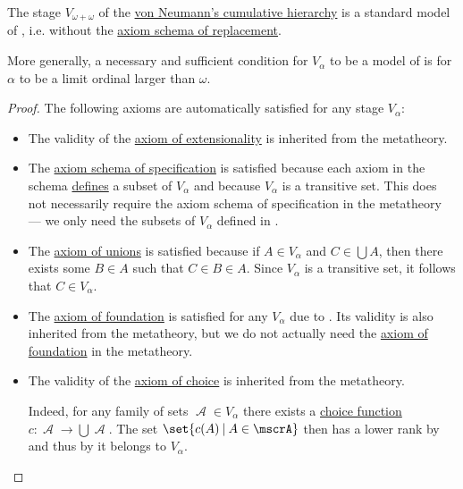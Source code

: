 \begin{theorem}\label{thm:cumulative_hierarchy_model_of_z}
  The stage \( V_{\omega + \omega} \) of the \hyperref[def:cumulative_hierarchy]{von Neumann's cumulative hierarchy} is a standard model of , i.e.  without the \hyperref[def:zfc/replacement]{axiom schema of replacement}.

  More generally, a necessary and sufficient condition for \( V_\alpha \) to be a model of  is for \( \alpha \) to be a limit ordinal larger than \( \omega \).
\end{theorem}
\begin{proof}
  The following axioms are automatically satisfied for any stage \( V_\alpha \):
  \begin{itemize}
    \item The validity of the \hyperref[def:zfc/extensionality]{axiom of extensionality} is inherited from the metatheory.

    \item The \hyperref[def:zfc/specification]{axiom schema of specification} is satisfied because each axiom in the schema \hyperref[def:first_order_definability]{defines} a subset of \( V_\alpha \) and because \( V_\alpha \) is a transitive set. This does not necessarily require the axiom schema of specification in the metatheory --- we only need the subsets of \( V_\alpha \) defined in .

    \item The \hyperref[def:zfc/union]{axiom of unions} is satisfied because if \( A \in V_\alpha \) and \( C \in \bigcup A \), then there exists some \( B \in A \) such that \( C \in B \in A \). Since \( V_\alpha \) is a transitive set, it follows that \( C \in V_\alpha \).

    \item The \hyperref[def:zfc/foundation]{axiom of foundation} is satisfied for any \( V_\alpha \) due to . Its validity is also inherited from the metatheory, but we do not actually need the \hyperref[def:zfc/foundation]{axiom of foundation} in the metatheory.

    \item The validity of the \hyperref[def:zfc/choice]{axiom of choice} is inherited from the metatheory.

    Indeed, for any family of sets \( \mscrA \in V_\alpha \) there exists a \hyperref[def:choice_function]{choice function} \( c: \mscrA \to \bigcup \mscrA \). The set \( \set{ c(A) \given A \in \mscrA } \) then has a lower rank by  and thus by  it belongs to \( V_\alpha \).
  \end{itemize}


\end{proof}
